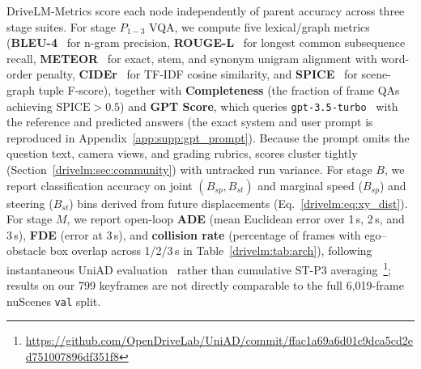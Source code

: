 DriveLM-Metrics score each node independently of parent accuracy across three stage suites. For stage $P_{1-3}$ VQA, we compute five lexical/graph metrics (\textbf{BLEU-4}~\cite{papineni2002bleu} for n-gram precision, \textbf{ROUGE-L}~\cite{lin2004rouge} for longest common subsequence recall, \textbf{METEOR}~\cite{lavie-agarwal-2007-meteor} for exact, stem, and synonym unigram alignment with word-order penalty, \textbf{CIDEr}~\cite{vedantam2015cider} for TF-IDF cosine similarity, and \textbf{SPICE}~\cite{anderson2016spice} for scene-graph tuple F-score), together with \textbf{Completeness} (the fraction of frame QAs achieving $\text{SPICE}>0.5$) and \textbf{GPT Score}, which queries \texttt{gpt-3.5-turbo}~\cite{ouyang2022training,chatgpt,sima2024drivelm} with the reference and predicted answers (the exact system and user prompt is reproduced in Appendix~\ref{app:supp:gpt_prompt}). Because the prompt omits the question text, camera views, and grading rubrics, scores cluster tightly (Section~\ref{drivelm:sec:community}) with untracked run variance. For stage $B$, we report classification accuracy on joint $(B_{sp},B_{st})$ and marginal speed ($B_{sp}$) and steering ($B_{st}$) bins derived from future displacements (Eq.~\eqref{drivelm:eq:xy_dist}). For stage $M$, we report open-loop \textbf{ADE} (mean Euclidean error over 1\,s, 2\,s, and 3\,s), \textbf{FDE} (error at 3\,s), and \textbf{collision rate} (percentage of frames with ego--obstacle box overlap across 1/2/3\,s in Table~\ref{drivelm:tab:arch}), following instantaneous UniAD evaluation~\cite{hu2023uniad} rather than cumulative ST-P3 averaging~\cite{hu2022stp3}\footnote{\raggedright\url{https://github.com/OpenDriveLab/UniAD/commit/ffac1a69a6d01c9dca5cd2ed751007896df351f8}}; results on our 799 keyframes are not directly comparable to the full 6,019-frame nuScenes \texttt{val} split.

